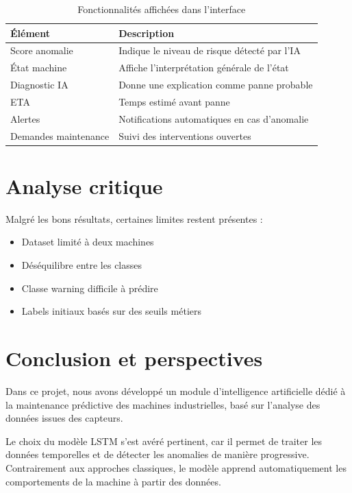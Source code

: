 \documentclass[a4paper,12pt]{article}
\begin{document}
\begin{table}[H]
\centering
\begin{tabular}{|l|p{10cm}|}
\hline
\textbf{Élément} & \textbf{Description} \\
\hline
Score anomalie & Indique le niveau de risque détecté par l’IA \\
\hline
État machine & Affiche l’interprétation générale de l’état \\
\hline
Diagnostic IA & Donne une explication comme panne probable \\
\hline
ETA & Temps estimé avant panne \\
\hline
Alertes & Notifications automatiques en cas d’anomalie \\
\hline
Demandes maintenance & Suivi des interventions ouvertes \\
\hline
\end{tabular}
\caption{Fonctionnalités affichées dans l’interface}
\end{table}

\section{Analyse critique}

Malgré les bons résultats, certaines limites restent présentes :
\begin{itemize}
\item Dataset limité à deux machines
\item Déséquilibre entre les classes
\item Classe warning difficile à prédire
\item Labels initiaux basés sur des seuils métiers
\end{itemize}

\section{Conclusion et perspectives}

Dans ce projet, nous avons développé un module d’intelligence artificielle dédié à la maintenance prédictive des machines industrielles, basé sur l’analyse des données issues des capteurs.

Le choix du modèle LSTM s’est avéré pertinent, car il permet de traiter les données temporelles et de détecter les anomalies de manière progressive. Contrairement aux approches classiques, le modèle apprend automatiquement les comportements de la machine à partir des données.
\end{document}
